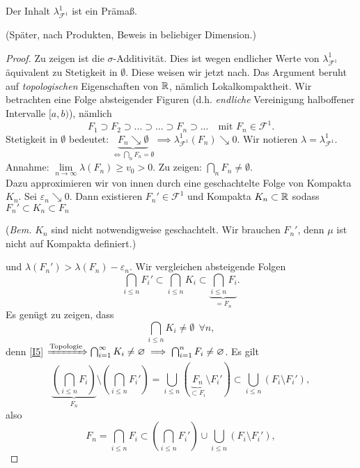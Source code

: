 \begin{satz}
\begin{mdframed}
Der Inhalt $\lambda^1_{\mathcal{F}^1}$ ist ein Prämaß.
\end{mdframed}
(Später, nach Produkten, Beweis in beliebiger Dimension.)
\begin{proof}
Zu zeigen ist die $\sigma$-Additivität. Dies ist wegen endlicher Werte von $\lambda^1_{\mathcal{F}^1}$ äquivalent zu Stetigkeit in $\emptyset$. Diese weisen wir jetzt nach. Das Argument beruht auf \emph{topologischen} Eigenschaften von $\R$, nämlich Lokalkompaktheit. Wir betrachten eine Folge absteigender Figuren (d.h. \emph{endliche} Vereinigung halboffener Intervalle $[a,b)$), nämlich
$$F_1 \supset F_2 \supset ... \supset ... \supset F_n \supset ...  \quad  \text{mit } F_n \in \mathcal{F}^1.$$
Stetigkeit in $\emptyset$ bedeutet: $\underbrace{F_n \searrow \emptyset}_{\iff \bigcap_n F_n = \emptyset} \implies \lambda^1_{\mathcal{F}^1}(F_n) \searrow 0$. Wir notieren $\lambda = \lambda^1_{\mathcal{F}^1}$.
Annahme: $\lim\limits_{n \to \infty} \lambda(F_n) \geq v_0 >0$. Zu zeigen: $\bigcap_n F_n \neq \emptyset$.\\
Dazu approximieren wir von innen durch eine geschachtelte Folge von Kompakta $K_n$.
Sei $\varepsilon_n \searrow 0$. Dann existieren $F_n' \in \mathcal{F}^1$ und Kompakta $K_n \subset \R$ sodass $F_n' \subset K_n \subset F_n$ \begin{scriptsize} (\textit{Bem.} $K_n$ sind nicht notwendigweise geschachtelt. Wir brauchen $F_n'$, denn $\mu$ ist nicht auf Kompakta definiert.) \end{scriptsize}und $\lambda(F_n') > \lambda(F_n) -\varepsilon_n$. Wir vergleichen absteigende Folgen
$$ \bigcap_{i\leq n} F_i' \subset \bigcap_{i \leq n} K_i \subset \underbrace{\bigcap_{i \leq n} F_i}_{= F_n}.$$
Es genügt zu zeigen, dass
\begin{equation}\label{I5}
\bigcap_{i \leq n} K_i \neq \emptyset \  \ \forall n,
\end{equation}
denn \eqref{I5} $ \xRightarrow{\text{Topologie}} \bigcap_{i=1}^\infty K_i \neq \emptyset \implies \bigcap_{i=1}^n F_i \neq \emptyset$. \newline
Es gilt
$$
\underbrace{\left( \bigcap_{i \leq n} F_i \right)}_{F_n} \setminus \left( \bigcap_{i \leq n} F_i' \right) = \bigcup_{i \leq n} (\underbrace{F_n}_{\subset F_i} \setminus F_i') \subset \bigcup_{i \leq n}(F_i \setminus F_i'),
$$
also
$$F_n = {\bigcap_{i\leq n} F_i} \subset \left( \bigcap_{i \leq n} F_i' \right) \cup \bigcup_{i \leq n} (F_i \setminus F_i'),$$

\end{proof}
\end{satz}
